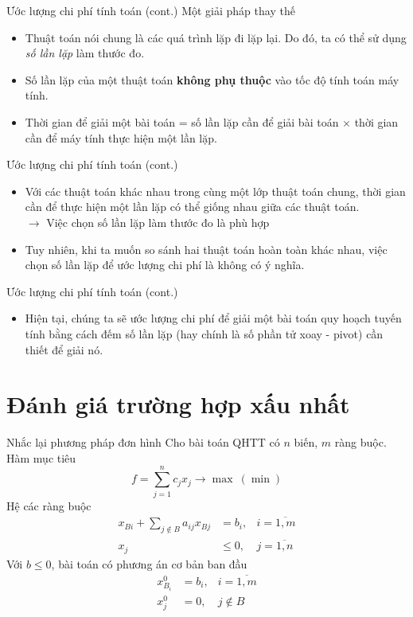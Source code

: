 \documentclass[10pt]{beamer}
\begin{document}
\begin{frame}{Ước lượng chi phí tính toán (cont.)}
Một giải pháp thay thế
\begin{itemize}
\item Thuật toán nói chung là các quá trình lặp đi lặp lại. Do đó, ta có thể sử dụng \textit{số lần lặp} làm thước đo.
\item Số lần lặp của một thuật toán \textbf{không phụ thuộc} vào tốc độ tính toán máy tính.
\item Thời gian để giải một bài toán = số lần lặp cần để giải bài toán $\times$ thời gian cần để máy tính thực hiện một lần lặp.
\end{itemize}
\end{frame}

\begin{frame}{Ước lượng chi phí tính toán (cont.)}  
\begin{itemize}
\item Với các thuật toán khác nhau trong cùng một lớp thuật toán chung, thời gian cần để thực hiện một lần lặp có thể giống nhau giữa các thuật toán.\\
$\rightarrow$ Việc chọn số lần lặp làm thước đo là phù hợp
\item Tuy nhiên, khi ta muốn so sánh hai thuật toán hoàn toàn khác nhau, việc chọn số lần lặp để ước lượng chi phí là không có ý nghĩa.
\end{itemize}
\end{frame}

\begin{frame}{Ước lượng chi phí tính toán (cont.)}  
\begin{itemize}
\item  Hiện tại, chúng ta sẽ ước lượng chi phí để giải một bài toán quy hoạch tuyến tính bằng cách đếm số lần lặp (hay chính là số phần tử xoay - pivot) cần thiết để giải nó.
\end{itemize}
\end{frame}

\section{Đánh giá trường hợp xấu nhất}
\begin{frame}{Nhắc lại phương pháp đơn hình}
Cho bài toán QHTT có $n$ biến, $m$ ràng buộc.
Hàm mục tiêu
$$
f = \sum_{j=1}^{n}c_jx_j \rightarrow \max\ (\min)
$$
Hệ các ràng buộc
\begin{equation*}
\begin{aligned}
x_{Bi} + \sum_{j \notin B}a_{ij}x_{Bj} &= b_i, &i = \overline{1, m}\\
x_j &\leq 0, &j = \overline{1, n}
\end{aligned}
\end{equation*}
Với $b \leq 0$, bài toán có phương án cơ bản ban đầu
\begin{equation*}
\begin{aligned}
x_{B_i}^0 &= b_i, &i = \overline{1, m}\\
x_j^0 &= 0, &j \notin B
\end{aligned}
\end{equation*}
\end{frame}
\end{document}
